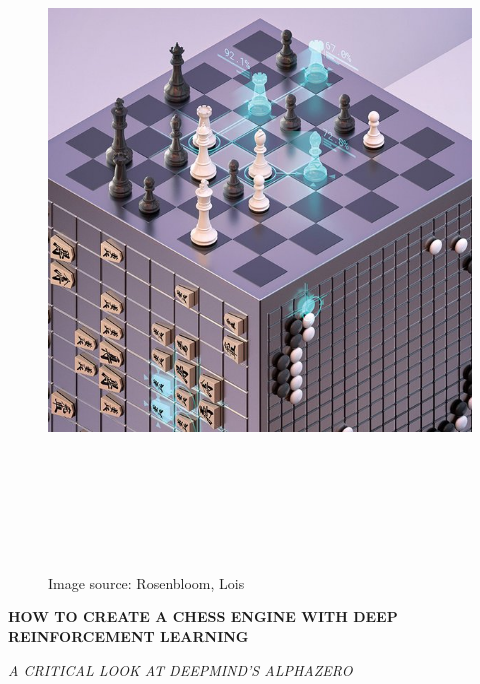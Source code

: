 \documentclass{article}
\begin{document}
\begin{titlepage}
    \begin{figure}[H]
        \centering
        \includegraphics[width=18.5cm,height=18.5cm]{img/cover.png}
        \caption{Image source: Rosenbloom, Lois {\cite{rosenbloomTopDogAlphaZero2019}}}
    \end{figure}
    \begin{adjustwidth}{1.5cm}{1.5cm}

    \vspace{0.5em}

    \MakeUppercase{\Huge\textbf{How to create a chess engine with Deep Reinforcement Learning}}

    \MakeUppercase{\Large\textit{A critical look at DeepMind's AlphaZero}}

    \vspace{1em}


\end{adjustwidth}
\end{titlepage}
\end{document}
